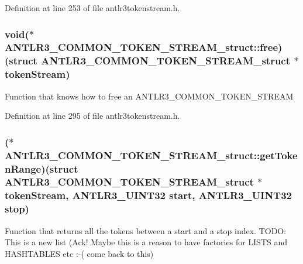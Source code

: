 Definition at line 253 of file antlr3tokenstream.\-h.

\hypertarget{struct_a_n_t_l_r3___c_o_m_m_o_n___t_o_k_e_n___s_t_r_e_a_m__struct_a062b7949ea434d5a82cf1a07a3f8c7ff}{
\subsubsection[{free}]{\setlength{\rightskip}{0pt plus 5cm}void($\ast$ A\-N\-T\-L\-R3\-\_\-\-C\-O\-M\-M\-O\-N\-\_\-\-T\-O\-K\-E\-N\-\_\-\-S\-T\-R\-E\-A\-M\-\_\-struct\-::free)(struct {\bf A\-N\-T\-L\-R3\-\_\-\-C\-O\-M\-M\-O\-N\-\_\-\-T\-O\-K\-E\-N\-\_\-\-S\-T\-R\-E\-A\-M\-\_\-struct} $\ast$token\-Stream)}}\label{struct_a_n_t_l_r3___c_o_m_m_o_n___t_o_k_e_n___s_t_r_e_a_m__struct_a062b7949ea434d5a82cf1a07a3f8c7ff}
Function that knows how to free an A\-N\-T\-L\-R3\-\_\-\-C\-O\-M\-M\-O\-N\-\_\-\-T\-O\-K\-E\-N\-\_\-\-S\-T\-R\-E\-A\-M 

Definition at line 295 of file antlr3tokenstream.\-h.

\hypertarget{struct_a_n_t_l_r3___c_o_m_m_o_n___t_o_k_e_n___s_t_r_e_a_m__struct_ab7edb18aa08d3a8826deca1cb976e31a}{
\subsubsection[{get\-Token\-Range}]{($\ast$ A\-N\-T\-L\-R3\-\_\-\-C\-O\-M\-M\-O\-N\-\_\-\-T\-O\-K\-E\-N\-\_\-\-S\-T\-R\-E\-A\-M\-\_\-struct\-::get\-Token\-Range)(struct {\bf A\-N\-T\-L\-R3\-\_\-\-C\-O\-M\-M\-O\-N\-\_\-\-T\-O\-K\-E\-N\-\_\-\-S\-T\-R\-E\-A\-M\-\_\-struct} $\ast$token\-Stream, {\bf A\-N\-T\-L\-R3\-\_\-\-U\-I\-N\-T32} start, {\bf A\-N\-T\-L\-R3\-\_\-\-U\-I\-N\-T32} stop)}}\label{struct_a_n_t_l_r3___c_o_m_m_o_n___t_o_k_e_n___s_t_r_e_a_m__struct_ab7edb18aa08d3a8826deca1cb976e31a}
Function that returns all the tokens between a start and a stop index. T\-O\-D\-O\-: This is a new list (Ack! Maybe this is a reason to have factories for L\-I\-S\-T\-S and H\-A\-S\-H\-T\-A\-B\-L\-E\-S etc \-:-\/( come back to this) 

